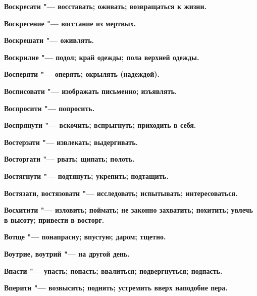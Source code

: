 \begin{multicols}{2}
\bfseries Воскресати\normalfont{} "--- восставать; оживать; возвращаться к жизни. 




\bfseries Воскресение\normalfont{} "--- восстание из мертвых. 




\bfseries Воскрешати\normalfont{} "--- оживлять. 




\bfseries Воскрилие\normalfont{} "--- подол; край одежды; пола верхней одежды. 




\bfseries Восперяти\normalfont{} "--- оперять; окрылять (надеждой). 




\bfseries Восписовати\normalfont{} "--- изображать письменно; изъявлять. 




\bfseries Воспросити\normalfont{} "--- попросить. 




\bfseries Воспрянути\normalfont{} "--- вскочить; вспрыгнуть; приходить в себя. 




\bfseries Востерзати\normalfont{} "--- извлекать; выдергивать. 




\bfseries Восторгати\normalfont{} "--- рвать; щипать; полоть. 




\bfseries Востягнути\normalfont{} "--- подтянуть; укрепить; подтащить. 




\bfseries Востязати, востязовати\normalfont{} "--- исследовать; испытывать; интересоваться. 




\bfseries Восхитити\normalfont{} "--- изловить; поймать; не законно захватить; похитить; увлечь в высоту; привести в восторг. 




\bfseries Вотще\normalfont{} "--- понапрасну; впустую; даром; тщетно. 




\bfseries Воутрие, воутрий\normalfont{} "--- на другой день. 




\bfseries Впасти\normalfont{} "--- упасть; попасть; ввалиться; подвергнуться; подпасть. 




\bfseries Вперити\normalfont{} "--- возвысить; поднять; устремить вверх наподобие пера. 





\end{multicols}
